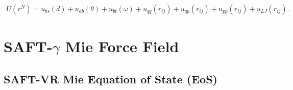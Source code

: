 \documentclass[
	12pt,				%
	openany,			%
	oneside,			%
	a4paper,			%
	english,			%
	brazil				%
	]{abntex2}
\providecommand{\DIFaddbegin}{}
\providecommand{\DIFaddend}{}
\providecommand{\DIFdelbegin}{}
\providecommand{\DIFdelend}{}
\providecommand{\DIFaddbegin}{} %
\providecommand{\DIFaddend}{} %
\providecommand{\DIFdelbegin}{} %
\providecommand{\DIFdelend}{} %
\begin{document}
\begin{equation}
\DIFdelbegin %
\DIFdelend \DIFaddbegin \begin{aligned}
U(r^N) = u_{bs}(d) + u_{ab}(\theta) + u_{bt}(\omega) + u_{qq}(r_{ij}) + u_{qp}(r_{ij})+ u_{pp}(r_{ij})+ u_{LJ}(r_{ij}) .
\end{aligned}
\DIFaddend \end{equation}

\section{SAFT-$\gamma$ Mie Force Field}


\subsection{SAFT-VR Mie Equation of State (EoS)}
\end{document}
